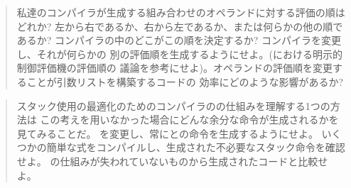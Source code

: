 \begin{quote}
私達のコンパイラが生成する組み合わせのオペランドに対する評価の順はどれか?
左から右であるか、右から左であるか、または何らかの他の順であるか?
コンパイラの中のどこがこの順を決定するか? コンパイラを変更し、それが何らかの
別の評価順を生成するようにせよ。(における明示的制御評価機の評価順の
議論を参考にせよ)。オペランドの評価順を変更することが引数リストを構築するコードの
効率にどのような影響があるか?
\end{quote}

\begin{quote}
スタック使用の最適化のためのコンパイラのの仕組みを理解する1つの方法は
この考えを用いなかった場合にどんな余分な命令が生成されるかを見てみることだ。
を変更し、常にとの命令を生成するようにせよ。
いくつかの簡単な式をコンパイルし、生成された不必要なスタック命令を確認せよ。
の仕組みが失われていないものから生成されたコードと比較せよ。
\end{quote}


